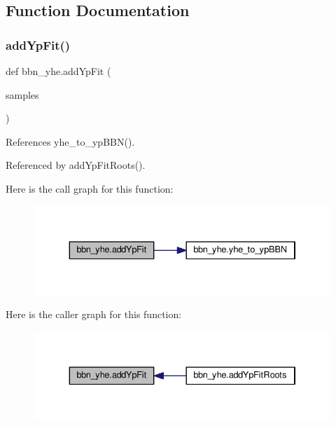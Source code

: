\subsection{Function Documentation}
\mbox{\label{namespacebbn__yhe_a207fd25c1dedf810f926879ba5899d38}} 
\subsubsection{\texorpdfstring{add\+Yp\+Fit()}{addYpFit()}}
{\footnotesize\ttfamily def bbn\+\_\+yhe.\+add\+Yp\+Fit (\begin{DoxyParamCaption}\item[{}]{samples }\end{DoxyParamCaption})}



References yhe\+\_\+to\+\_\+yp\+B\+B\+N().



Referenced by add\+Yp\+Fit\+Roots().

Here is the call graph for this function\+:
\nopagebreak
\begin{figure}[H]
\begin{center}
\leavevmode
\includegraphics[width=334pt]{namespacebbn__yhe_a207fd25c1dedf810f926879ba5899d38_cgraph}
\end{center}
\end{figure}
Here is the caller graph for this function\+:
\nopagebreak
\begin{figure}[H]
\begin{center}
\leavevmode
\includegraphics[width=334pt]{namespacebbn__yhe_a207fd25c1dedf810f926879ba5899d38_icgraph}
\end{center}
\end{figure}
\mbox{\label{namespacebbn__yhe_ab07e92f80f62d425303d08e5e8fe604d}} 
